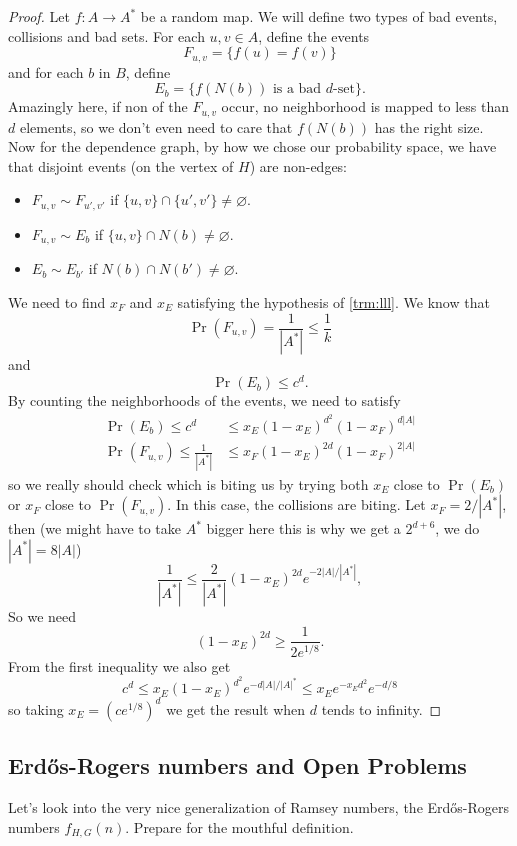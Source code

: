 \begin{proof}
	Let $f:A \to A^*$ be a random map. We will define two types of bad
	events, collisions and bad sets. For each $u,v \in A$,
	define the events
	\[
		F_{u,v} = \{f(u) = f(v)\}
	\]
	and for each $b$ in $B$, define
	\[
		E_b = \{f(N(b)) \text{ is a bad $d$-set}\}.
	\]
	Amazingly here, if non of the $F_{u,v}$ occur, no neighborhood is
	mapped to less than $d$ elements,
	so we don't even need to care that $f(N(b))$ has the right size. Now
	for the dependence graph, by how we chose our probability
	space, we have that disjoint events (on the vertex of $H$) are non-edges:
	\begin{itemize}
		\item $F_{u,v} \sim F_{u',v'}$ if $\{u,v\} \cap \{u',v'\} \neq \varnothing$.
		\item $F_{u,v} \sim E_b$ if $\{u,v\} \cap N(b) \neq \varnothing$.
		\item $E_b \sim E_{b'}$ if $N(b) \cap N(b') \neq \varnothing$.
	\end{itemize}
	We need to find $x_F$ and $x_E$ satisfying the hypothesis of
	\ref{trm:lll}. We know that
	\[
		\Pr(F_{u,v}) = \frac{1}{|A^*|} \leq \frac{1}{k}
	\]
	and
	\[
		\Pr(E_b) \leq c^d.
	\]
	By counting the neighborhoods of the events, we need to satisfy
	\begin{align*}
		\Pr(E_b) \leq c^d &\leq x_E (1 - x_E)^{d^2}(1 - x_F)^{d|A|}\\
		\Pr(F_{u,v}) \leq \frac{1}{|A^*|} &\leq x_F (1-x_E)^{2d}(1 - x_F)^{2|A|}
	\end{align*}
	so we really should check which is biting us by trying both $x_E$
	close to $\Pr(E_b)$ or $x_F$ close to $\Pr(F_{u,v})$.
	In this case, the collisions are biting. Let $x_F = 2/|A^*|$, then
	(we might have to take $A^*$ bigger here this is why we get a $2^{d
	+ 6}$, we do $|A^*| = 8|A|$)
	\[
		\frac{1}{|A^*|} \leq \frac{2}{|A^*|}(1 - x_E)^{2d}e^{-2{|A|/|A^*|}},
	\]
	So we need
	\[
		(1 - x_E)^{2d} \geq \frac{1}{2e^{1/8}}.
	\]
	From the first inequality we also get
	\[
		c^d \leq x_E(1 - x_E)^{d^2}e^{-d|A|/|A|^*} \leq x_E e^{-x_E d^2}e^{-d/8}
	\]
	so taking $x_E = (ce^{1/8})^d$ we get the result when $d$ tends to infinity.

\end{proof}

\subsection{Erd\H{o}s-Rogers numbers and Open Problems}

Let's look into the very nice generalization of Ramsey numbers, the
Erd\H{o}s-Rogers numbers $f_{H,G}(n)$.
Prepare for the mouthful definition.

